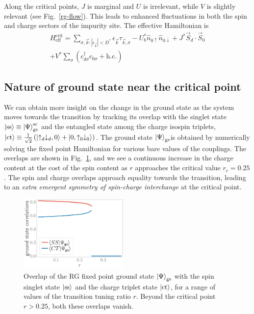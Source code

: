 \documentclass[reprint,superscriptaddress,floatfix]{revtex4-2}
\begin{document}
Along the critical points, \(J\) is marginal and \(U\) is irrelevant, while \(V\) is slightly relevant (see Fig.~\ref{rg-flow}). This leads to enhanced fluctuations in both the spin and charge sectors of the impurity site. The effective Hamiltonian is
\begin{equation}\begin{aligned}
	H_\text{eff}^\text{crit} = \sum_{\sigma,\vec k:|\epsilon_{\vec k}| < D^*} \epsilon_{\vec k} \tau_{\vec k,\sigma} - U_b^* \hat n_{0 \uparrow} \hat n_{0 \downarrow} + J^* \vec{S}_d\cdot\vec{S}_0\\
	+ V^*\sum_\sigma \left( c^\dagger_{d\sigma}c_{0\sigma} + \text{h.c.}\right) 
\end{aligned}\end{equation}

\subsection{Nature of ground state near the critical point}

We can obtain more insight on the change in the ground state as the system moves towards the transition by tracking its overlap with the singlet state \(\ket{\text{ss}} \equiv \ket{\Psi}_\text{gs}^\text{sc}\) and the entangled state among the charge isospin triplets, \(\ket{\text{ct}} \equiv \frac{1}{\sqrt 2}\left(\ket{\uparrow_d \downarrow_d,0} + \ket{0,\uparrow_0 \downarrow_0}\right)\). The ground state \(\ket{\Psi}_\text{gs}\)is obtained by numerically solving the fixed point Hamiltonian for various bare values of the couplings. The overlaps are shown in Fig.~\ref{overlaps}, and we see a continuous increase in the charge content at the cost of the spin content as \(r\) approaches the critical value \(r_c = 0.25\). The spin and charge overlaps approach equality towards the transition, leading to an {\it extra emergent symmetry of spin-charge interchange} at the critical point.

\begin{figure}[!htb]
	\centering
\includegraphics[width=0.48\textwidth]{corrs_gs.pdf}
\caption{Overlap of the RG fixed point ground state \(\ket{\Psi}_\text{gs}\) with the spin singlet state \(\ket{\text{ss}}\) and the charge triplet state \(\ket{\text{ct}}\), for a range of values of the transition tuning ratio \(r\). Beyond the critical point \(r > 0.25\), both these overlaps vanish.}
	\label{overlaps}
\end{figure}
\end{document}
